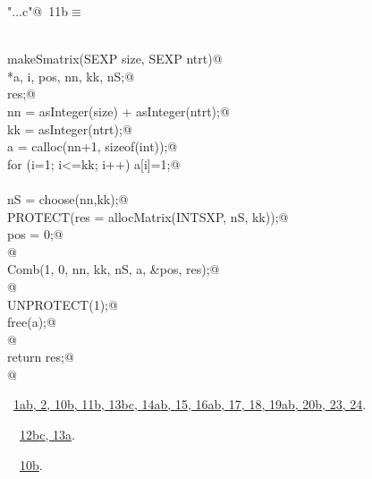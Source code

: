 \documentclass[reqno]{amsart}
\renewcommand{\NWtarget}[2]{\hypertarget{#1}{#2}}
\renewcommand{\NWlink}[2]{\hyperlink{#1}{#2}}
\begin{document}
\begin{flushleft} \small
\begin{minipage}{\linewidth}\label{scrap14}\raggedright\small
\NWtarget{nuweb11b}{} \verb@"..\src\ReprodCalcs.c"@\nobreak\ {\footnotesize {11b}}$\equiv$
\vspace{-1ex}
\begin{list}{}{} \item
\mbox{}\verb@@\\
\mbox{}\verb@SEXP makeSmatrix(SEXP size, SEXP ntrt){@\\
\mbox{}\verb@int *a, i, pos, nn, kk, nS;@\\
\mbox{}\verb@SEXP res;@\\
\mbox{}\verb@   nn = asInteger(size) + asInteger(ntrt);@\\
\mbox{}\verb@   kk = asInteger(ntrt);@\\
\mbox{}\verb@   a = calloc(nn+1, sizeof(int));@\\
\mbox{}\verb@   for (i=1; i<=kk; i++) a[i]=1;@\\
\mbox{}\verb@@\\
\mbox{}\verb@   nS = choose(nn,kk);@\\
\mbox{}\verb@   PROTECT(res = allocMatrix(INTSXP, nS, kk));@\\
\mbox{}\verb@   pos = 0;@\\
\mbox{}\verb@   @\\
\mbox{}\verb@   Comb(1, 0, nn, kk, nS, a, &pos, res);@\\
\mbox{}\verb@  @\\
\mbox{}\verb@   UNPROTECT(1);@\\
\mbox{}\verb@   free(a);@\\
\mbox{}\verb@ @\\
\mbox{}\verb@  return res;@\\
\mbox{}\verb@}@\\
\mbox{}\verb@@{\NWsep}
\end{list}
\vspace{-1.5ex}
\footnotesize
\begin{list}{}{\setlength{\itemsep}{-\parsep}\setlength{\itemindent}{-\leftmargin}}
\item \NWtxtFileDefBy\ \NWlink{nuweb1a}{1a}\NWlink{nuweb1b}{b}\NWlink{nuweb2}{, 2}\NWlink{nuweb10b}{, 10b}\NWlink{nuweb11b}{, 11b}\NWlink{nuweb13b}{, 13b}\NWlink{nuweb13c}{c}\NWlink{nuweb14a}{, 14a}\NWlink{nuweb14b}{b}\NWlink{nuweb15}{, 15}\NWlink{nuweb16a}{, 16a}\NWlink{nuweb16b}{b}\NWlink{nuweb17}{, 17}\NWlink{nuweb18}{, 18}\NWlink{nuweb19a}{, 19a}\NWlink{nuweb19b}{b}\NWlink{nuweb20b}{, 20b}\NWlink{nuweb23}{, 23}\NWlink{nuweb24}{, 24}.
\item \NWtxtIdentsDefed\nobreak\  \verb@makeSmatrix@\nobreak\ \NWlink{nuweb12b}{12b}\NWlink{nuweb12c}{c}\NWlink{nuweb13a}{, 13a}.\item \NWtxtIdentsUsed\nobreak\  \verb@Comb@\nobreak\ \NWlink{nuweb10b}{10b}.
\item{}
\end{list}
\end{minipage}\vspace{4ex}
\end{flushleft}
\end{document}
